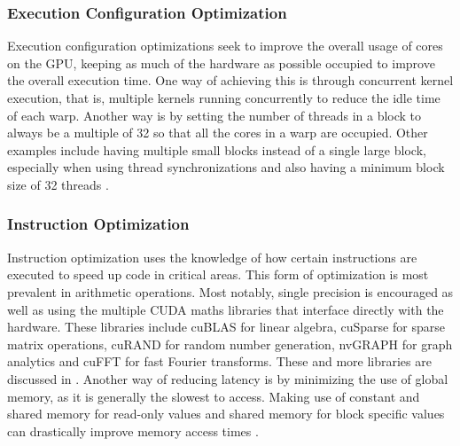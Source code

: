 \subsubsection{Execution Configuration Optimization}
Execution configuration optimizations seek to improve the overall usage of cores on the GPU, keeping as much of the hardware as possible occupied to improve the overall execution time. One way of achieving this is through concurrent kernel execution, that is, multiple kernels running concurrently to reduce the idle time of each warp. Another way is by setting the number of threads in a block to always be a multiple of 32 so that all the cores in a warp are occupied. Other examples include having multiple small blocks instead of a single large block, especially when using thread synchronizations and also having a minimum block size of 32 threads \citep{CUDA}.
%
\subsubsection{Instruction Optimization}
Instruction optimization uses the knowledge of how certain instructions are executed to speed up code in critical areas. This form of optimization is most prevalent in arithmetic operations. Most notably, single precision is encouraged as well as using the multiple CUDA maths libraries that interface directly with the hardware. These libraries include cuBLAS for linear algebra, cuSparse for sparse matrix operations, cuRAND for random number generation, nvGRAPH for graph analytics and cuFFT for fast Fourier transforms. These and more libraries are discussed in \citep{CUDA_lib}. Another way of reducing latency is by minimizing the use of global memory, as it is generally the slowest to access. Making use of constant and shared memory for read-only values and shared memory for block specific values can drastically improve memory access times \citep{CUDA}.
